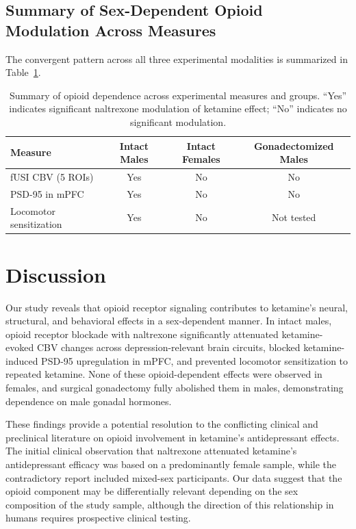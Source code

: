 \documentclass[11pt]{article}
\begin{document}
\subsection{Summary of Sex-Dependent Opioid Modulation Across Measures}

The convergent pattern across all three experimental modalities is summarized in Table~\ref{tab:summary}.

\begin{table}[H]
\centering
\caption{Summary of opioid dependence across experimental measures and groups. ``Yes'' indicates significant naltrexone modulation of ketamine effect; ``No'' indicates no significant modulation.}
\label{tab:summary}
\begin{tabular}{lccc}
\toprule
Measure & Intact Males & Intact Females & Gonadectomized Males \\
\midrule
fUSI CBV (5 ROIs) & Yes & No & No \\
PSD-95 in mPFC & Yes & No & No \\
Locomotor sensitization & Yes & No & Not tested \\
\bottomrule
\end{tabular}
\end{table}

\section{Discussion}

Our study reveals that opioid receptor signaling contributes to ketamine's neural, structural, and behavioral effects in a sex-dependent manner. In intact males, opioid receptor blockade with naltrexone significantly attenuated ketamine-evoked CBV changes across depression-relevant brain circuits, blocked ketamine-induced PSD-95 upregulation in mPFC, and prevented locomotor sensitization to repeated ketamine. None of these opioid-dependent effects were observed in females, and surgical gonadectomy fully abolished them in males, demonstrating dependence on male gonadal hormones.

These findings provide a potential resolution to the conflicting clinical and preclinical literature on opioid involvement in ketamine's antidepressant effects. The initial clinical observation that naltrexone attenuated ketamine's antidepressant efficacy \citep{williams2018attenuation} was based on a predominantly female sample, while the contradictory report \citep{yoon2019association} included mixed-sex participants. Our data suggest that the opioid component may be differentially relevant depending on the sex composition of the study sample, although the direction of this relationship in humans requires prospective clinical testing.
\end{document}
